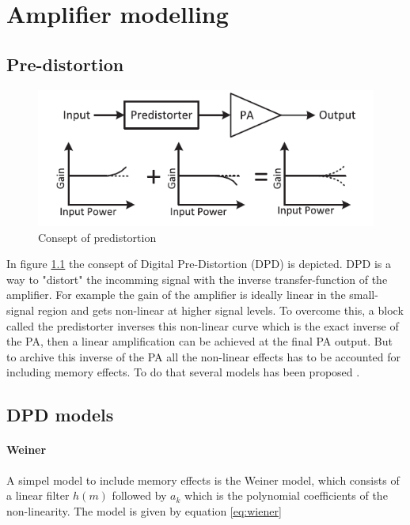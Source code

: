\chapter{Amplifier modelling}\label{ch:3}

\section{Pre-distortion}

\begin{figure}[H]
\centering 
\includegraphics[scale = 0.7]{figures/ch1/predistortion_consept.png}
\caption{Consept of predistortion \citep{guo2015}}
\label{fig:pre_cons}
\end{figure}

In figure \ref{fig:pre_cons} the consept of Digital Pre-Distortion (DPD) is depicted. DPD is a way to "distort" the incomming signal with the inverse transfer-function of the amplifier. For example the gain of the amplifier is ideally linear in the small-signal region and gets non-linear at higher signal levels. To overcome this, a block called the predistorter inverses this non-linear curve which is the exact inverse of the PA, then a linear amplification can be achieved at the final PA output. But to archive this inverse of the PA all the non-linear effects has to be accounted for including memory effects. To do that several models has been proposed \citep{morgan2006}.

\section{DPD models}


\subsubsection{Weiner}
A simpel model to include memory effects is the Weiner model, which consists of a linear filter $h(m)$ followed by $a_k$ which is the polynomial coefficients of the non-linearity. The model is given by equation \ref{eq:wiener}

